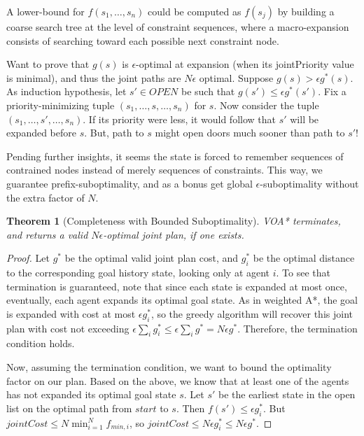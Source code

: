 \documentclass[letterpaper]{article}
\newtheorem{thm}{Theorem}
\begin{document}
A lower-bound for $f(s_1,\ldots,s_n)$ could be computed as $f(s_j)$ by building a coarse search tree at the level of constraint sequences, where a macro-expansion consists of searching toward each possible next constraint node.

Want to prove that $g(s)$ is $\epsilon$-optimal at expansion (when its jointPriority value is minimal), and thus the joint paths are $N\epsilon$ optimal. Suppose $g(s) > \epsilon g^*(s)$. As induction hypothesis, let $s'\in OPEN$ be such that $g(s') \le \epsilon g^*(s')$. Fix a priority-minimizing tuple $(s_1,\ldots,s,\ldots,s_n)$ for $s$. Now consider the tuple $(s_1,\ldots,s',\ldots,s_n)$. If its priority were less, it would follow that $s'$ will be expanded before $s$. But, path to $s$ might open doors much sooner than path to $s'$!

Pending further insights, it seems the state is forced to remember sequences of contrained nodes instead of merely sequences of constraints. This way, we guarantee prefix-suboptimality, and as a bonus get global $\epsilon$-suboptimality without the extra factor of $N$.

\begin{thm}[Completeness with Bounded Suboptimality]
VOA* terminates, and returns a valid $N\epsilon$-optimal joint plan, if one exists.
\end{thm}

\begin{proof}
Let $g^*$ be the optimal valid joint plan cost, and $g_i^*$ be the optimal distance to the corresponding goal history state, looking only at agent $i$. To see that termination is guaranteed, note that since each state is expanded at most once, eventually, each agent expands its optimal goal state. As in weighted A*, the goal is expanded with cost at most $\epsilon g_i^*$, so the greedy algorithm will recover this joint plan with cost not exceeding $\epsilon \sum_i g_i^* \le \epsilon \sum_i g^* = N\epsilon g^*$. Therefore, the termination condition holds.

Now, assuming the termination condition, we want to bound the optimality factor on our plan. Based on the above, we know that at least one of the agents has not expanded its optimal goal state $s$. Let $s'$ be the earliest state in the open list on the optimal path from $start$ to $s$. Then $f(s') \le \epsilon g_i^*$. But $jointCost \le N \min_{i=1}^N f_{min,i}$, so $jointCost \le N \epsilon g_i^* \le N\epsilon g^*$.
\end{proof}
\end{document}
